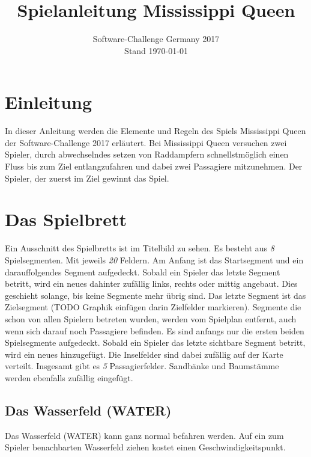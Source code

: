 \documentclass[12pt,a4paper, ngerman, oneside]{scrartcl}
\date{Software-Challenge Germany 2017\\Stand \today}
\title{Spielanleitung Mississippi Queen}
\newcommand\blfootnote[1]{%
  \begingroup
  \renewcommand\thefootnote{}\footnote{#1}%
  \addtocounter{footnote}{-1}%
  \endgroup
}
\newcommand{\Tiles}{\emph{8}}
\newcommand{\FieldsPerTile}{\emph{20}}
\newcommand{\Passagiere}{\emph{5}}
\begin{document}
\maketitle
\vspace*{\fill}


\newpage
\tableofcontents
\thispagestyle{empty}
\newpage
\setcounter{page}{1}
\section{Einleitung}
In dieser Anleitung werden die Elemente und Regeln des Spiels Mississippi Queen der
Software-Challenge 2017 erläutert.
Bei Mississippi Queen versuchen zwei Spieler, durch abwechselndes setzen von Raddampfern 
schnellstmöglich einen Fluss bis zum Ziel entlangzufahren und dabei zwei Passagiere mitzunehmen.
Der Spieler, der zuerst im Ziel gewinnt das Spiel.
\section{Das Spielbrett}
Ein Ausschnitt des Spielbretts ist im Titelbild zu sehen. Es besteht aus \emph{\Tiles} Spielsegmenten. Mit jeweils \emph{\FieldsPerTile} Feldern. Am Anfang ist das Startsegment und ein darauffolgendes Segment aufgedeckt. Sobald ein Spieler das letzte Segment betritt, wird ein neues dahinter zufällig links, rechts oder mittig angebaut. Dies geschieht solange, bis keine Segmente mehr übrig sind. Das letzte Segment ist das Zielsegment (TODO Graphik einfügen darin Zielfelder markieren). Segmente die schon von allen Spielern betreten wurden, werden vom Spielplan entfernt, auch wenn sich darauf noch Passagiere befinden. Es sind anfangs nur die ersten beiden Spielsegmente aufgedeckt. Sobald ein Spieler das letzte sichtbare Segment betritt, wird ein neues hinzugefügt.
Die Inselfelder sind dabei zufällig auf der Karte verteilt. Insgesamt gibt es \emph{\Passagiere} Passagierfelder. Sandbänke und Baumstämme werden ebenfalls zufällig eingefügt.
\subsection{Das Wasserfeld (WATER)}
Das Wasserfeld (WATER) kann ganz normal befahren werden. Auf ein zum Spieler benachbarten Wasserfeld ziehen kostet einen Geschwindigkeitspunkt.
\end{document}
